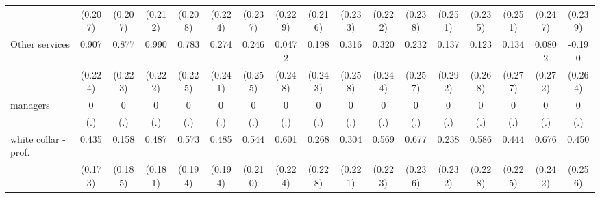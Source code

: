 {\begin{tabular}{l*{16}{c}}
                    &     (0.207)         &     (0.207)         &     (0.212)         &     (0.208)         &     (0.224)         &     (0.237)         &     (0.229)         &     (0.216)         &     (0.233)         &     (0.222)         &     (0.238)         &     (0.251)         &     (0.235)         &     (0.251)         &     (0.247)         &     (0.239)         \\
[1em]
Other services      &       0.907\sym{***}&       0.877\sym{***}&       0.990\sym{***}&       0.783\sym{***}&       0.274         &       0.246         &      0.0472         &       0.198         &       0.316         &       0.320         &       0.232         &       0.137         &       0.123         &       0.134         &      0.0802         &      -0.190         \\
                    &     (0.224)         &     (0.223)         &     (0.222)         &     (0.225)         &     (0.241)         &     (0.255)         &     (0.248)         &     (0.243)         &     (0.258)         &     (0.244)         &     (0.257)         &     (0.292)         &     (0.268)         &     (0.277)         &     (0.272)         &     (0.264)         \\
[1em]
managers            &           0         &           0         &           0         &           0         &           0         &           0         &           0         &           0         &           0         &           0         &           0         &           0         &           0         &           0         &           0         &           0         \\
                    &         (.)         &         (.)         &         (.)         &         (.)         &         (.)         &         (.)         &         (.)         &         (.)         &         (.)         &         (.)         &         (.)         &         (.)         &         (.)         &         (.)         &         (.)         &         (.)         \\
[1em]
white collar - prof.&       0.435\sym{*}  &       0.158         &       0.487\sym{**} &       0.573\sym{**} &       0.485\sym{*}  &       0.544\sym{**} &       0.601\sym{**} &       0.268         &       0.304         &       0.569\sym{*}  &       0.677\sym{**} &       0.238         &       0.586\sym{*}  &       0.444\sym{*}  &       0.676\sym{**} &       0.450         \\
                    &     (0.173)         &     (0.185)         &     (0.181)         &     (0.194)         &     (0.194)         &     (0.210)         &     (0.224)         &     (0.228)         &     (0.221)         &     (0.223)         &     (0.236)         &     (0.232)         &     (0.228)         &     (0.225)         &     (0.242)         &     (0.256)         \\

\end{tabular}}
